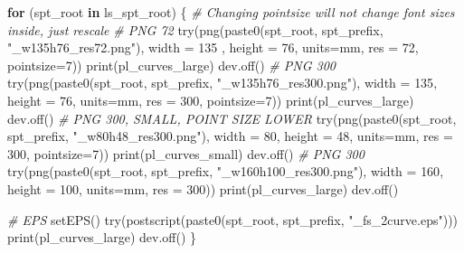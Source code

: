 \documentclass[
]{book}
\newenvironment{Shaded}{\begin{snugshade}}{\end{snugshade}}
\newcommand{\AttributeTok}[1]{\textcolor[rgb]{0.77,0.63,0.00}{#1}}
\newcommand{\CommentTok}[1]{\textcolor[rgb]{0.56,0.35,0.01}{\textit{#1}}}
\newcommand{\ControlFlowTok}[1]{\textcolor[rgb]{0.13,0.29,0.53}{\textbf{#1}}}
\newcommand{\DecValTok}[1]{\textcolor[rgb]{0.00,0.00,0.81}{#1}}
\newcommand{\FunctionTok}[1]{\textcolor[rgb]{0.00,0.00,0.00}{#1}}
\newcommand{\NormalTok}[1]{#1}
\newcommand{\StringTok}[1]{\textcolor[rgb]{0.31,0.60,0.02}{#1}}
\begin{document}
\begin{Shaded}
\begin{Highlighting}[]
\ControlFlowTok{for}\NormalTok{ (spt\_root }\ControlFlowTok{in}\NormalTok{ ls\_spt\_root) \{}
  \CommentTok{\# Changing pointsize will not change font sizes inside, just rescale}
  \CommentTok{\# PNG 72}
  \FunctionTok{try}\NormalTok{(}\FunctionTok{png}\NormalTok{(}\FunctionTok{paste0}\NormalTok{(spt\_root, spt\_prefix, }\StringTok{"\_w135h76\_res72.png"}\NormalTok{),}
      \AttributeTok{width =} \DecValTok{135}\NormalTok{ , }\AttributeTok{height =} \DecValTok{76}\NormalTok{, }\AttributeTok{units=}\StringTok{\textquotesingle{}mm\textquotesingle{}}\NormalTok{, }\AttributeTok{res =} \DecValTok{72}\NormalTok{, }\AttributeTok{pointsize=}\DecValTok{7}\NormalTok{))}
  \FunctionTok{print}\NormalTok{(pl\_curves\_large)}
  \FunctionTok{dev.off}\NormalTok{()}
  \CommentTok{\# PNG 300}
  \FunctionTok{try}\NormalTok{(}\FunctionTok{png}\NormalTok{(}\FunctionTok{paste0}\NormalTok{(spt\_root, spt\_prefix, }\StringTok{"\_w135h76\_res300.png"}\NormalTok{),}
      \AttributeTok{width =} \DecValTok{135}\NormalTok{, }\AttributeTok{height =} \DecValTok{76}\NormalTok{, }\AttributeTok{units=}\StringTok{\textquotesingle{}mm\textquotesingle{}}\NormalTok{, }\AttributeTok{res =} \DecValTok{300}\NormalTok{, }\AttributeTok{pointsize=}\DecValTok{7}\NormalTok{))}
  \FunctionTok{print}\NormalTok{(pl\_curves\_large)}
  \FunctionTok{dev.off}\NormalTok{()}
  \CommentTok{\# PNG 300, SMALL, POINT SIZE LOWER}
  \FunctionTok{try}\NormalTok{(}\FunctionTok{png}\NormalTok{(}\FunctionTok{paste0}\NormalTok{(spt\_root, spt\_prefix, }\StringTok{"\_w80h48\_res300.png"}\NormalTok{),}
      \AttributeTok{width =} \DecValTok{80}\NormalTok{, }\AttributeTok{height =} \DecValTok{48}\NormalTok{, }\AttributeTok{units=}\StringTok{\textquotesingle{}mm\textquotesingle{}}\NormalTok{, }\AttributeTok{res =} \DecValTok{300}\NormalTok{, }\AttributeTok{pointsize=}\DecValTok{7}\NormalTok{))}
  \FunctionTok{print}\NormalTok{(pl\_curves\_small)}
  \FunctionTok{dev.off}\NormalTok{()}
  \CommentTok{\# PNG 300}
  \FunctionTok{try}\NormalTok{(}\FunctionTok{png}\NormalTok{(}\FunctionTok{paste0}\NormalTok{(spt\_root, spt\_prefix, }\StringTok{"\_w160h100\_res300.png"}\NormalTok{),}
      \AttributeTok{width =} \DecValTok{160}\NormalTok{, }\AttributeTok{height =} \DecValTok{100}\NormalTok{, }\AttributeTok{units=}\StringTok{\textquotesingle{}mm\textquotesingle{}}\NormalTok{, }\AttributeTok{res =} \DecValTok{300}\NormalTok{))}
  \FunctionTok{print}\NormalTok{(pl\_curves\_large)}
  \FunctionTok{dev.off}\NormalTok{()}

  \CommentTok{\# EPS}
  \FunctionTok{setEPS}\NormalTok{()}
  \FunctionTok{try}\NormalTok{(}\FunctionTok{postscript}\NormalTok{(}\FunctionTok{paste0}\NormalTok{(spt\_root, spt\_prefix, }\StringTok{"\_fs\_2curve.eps"}\NormalTok{)))}
  \FunctionTok{print}\NormalTok{(pl\_curves\_large)}
  \FunctionTok{dev.off}\NormalTok{()}
\NormalTok{\}}
\end{Highlighting}
\end{Shaded}
\end{document}
